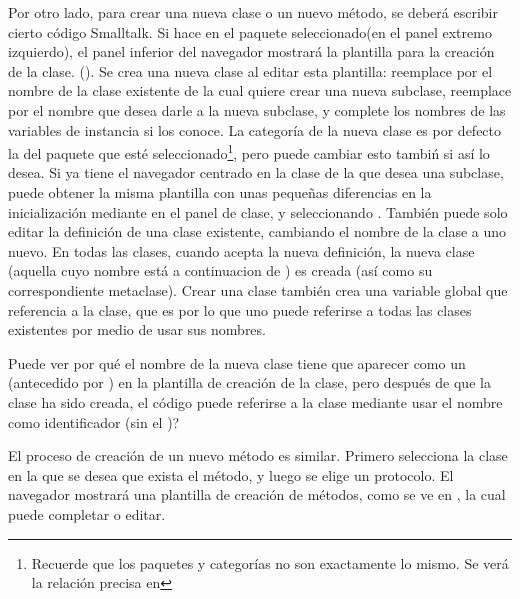 \documentclass[a4paper,10pt,twoside]{book}
\begin{document}
Por otro lado, para crear una nueva clase o un nuevo m\'etodo, se deber\'a escribir
cierto c\'odigo Smalltalk. Si hace \click en el paquete
seleccionado(en el panel extremo izquierdo), el panel
inferior del navegador mostrar\'a la plantilla para la creaci\'on de la clase.
().  Se crea una nueva clase al
editar esta plantilla: reemplace  por el nombre de la clase existente
de la cual quiere crear una nueva subclase, reemplace
 por el nombre que desea darle a la nueva
subclase, y complete los nombres de las variables de instancia si los
conoce.  La categor\'ia de la nueva clase es por defecto la del paquete
que est\'e seleccionado\footnote{Recuerde que los paquetes y categor\'ias no son exactamente lo mismo. Se ver\'a la relaci\'on precisa en }, pero puede cambiar esto tambi\'n si as\'i lo desea.  Si
ya tiene el navegador centrado en la clase de la que desea una
subclase, puede obtener la misma plantilla con unas pequeñas diferencias en la
inicializaci\'on mediante  en el panel de clase, y
seleccionando .  Tambi\'en puede solo
editar la definici\'on de una clase existente, cambiando el nombre de la clase a
uno nuevo.  En todas las clases, cuando acepta la nueva definici\'on, la
nueva clase (aquella cuyo nombre est\'a a continuacion de \ct{#}) es creada (as\'i como
su correspondiente metaclase).  Crear una clase tambi\'en crea una variable global
que referencia a la clase, que es por lo que uno puede referirse a todas las
clases existentes por medio de usar sus nombres.  

Puede ver por qu\'e el nombre de la nueva clase tiene que aparecer como un  (\ie antecedido por \ct{#}) en la plantilla de creaci\'on de la clase, pero despu\'es de que la clase ha sido creada, el c\'odigo puede referirse a la clase mediante usar el nombre como identificador (\ie sin el \ct{#})?

El proceso de creaci\'on de un nuevo m\'etodo es similar. Primero selecciona la clase en la que se desea que exista el m\'etodo, y luego se elige un protocolo.  El navegador mostrar\'a una plantilla de creaci\'on de m\'etodos, como se ve en , la cual puede completar o editar.
\end{document}
